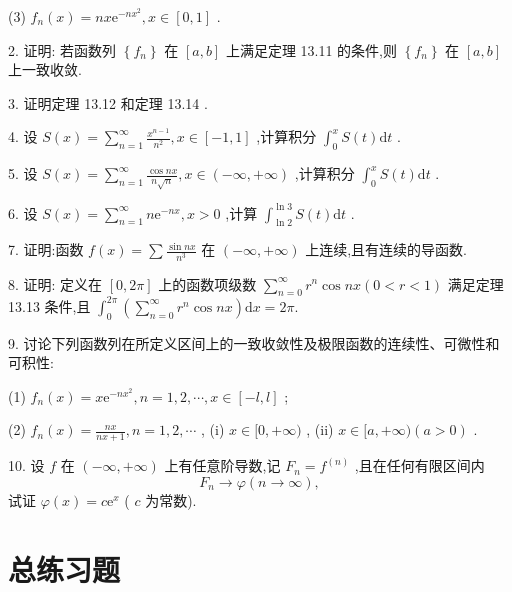 (3) \({f}_{n}\left( x\right)  = {nx}{\mathrm{e}}^{-n{x}^{2}},x \in  \left\lbrack  {0,1}\right\rbrack\) .

2. 证明: 若函数列 \(\left\{  {f}_{n}\right\}\) 在 \(\left\lbrack  {a,b}\right\rbrack\) 上满足定理 13.11 的条件,则 \(\left\{  {f}_{n}\right\}\) 在 \(\left\lbrack  {a,b}\right\rbrack\) 上一致收敛.

3. 证明定理 13.12 和定理 13.14 .

4. 设 \(S\left( x\right)  = \mathop{\sum }\limits_{{n = 1}}^{\infty }\frac{{x}^{n - 1}}{{n}^{2}},x \in  \left\lbrack  {-1,1}\right\rbrack\) ,计算积分 \({\int }_{0}^{x}S\left( t\right) \mathrm{d}t\) .

5. 设 \(S\left( x\right)  = \mathop{\sum }\limits_{{n = 1}}^{\infty }\frac{\cos {nx}}{n\sqrt{n}},x \in  \left( {-\infty , + \infty }\right)\) ,计算积分 \({\int }_{0}^{x}S\left( t\right) \mathrm{d}t\) .

6. 设 \(S\left( x\right)  = \mathop{\sum }\limits_{{n = 1}}^{\infty }n{\mathrm{e}}^{-{nx}},x > 0\) ,计算 \({\int }_{\ln 2}^{\ln 3}S\left( t\right) \mathrm{d}t\) .

7. 证明:函数 \(f\left( x\right)  = \sum \frac{\sin {nx}}{{n}^{3}}\) 在 \(\left( {-\infty , + \infty }\right)\) 上连续,且有连续的导函数.

8. 证明: 定义在 \(\left\lbrack  {0,{2\pi }}\right\rbrack\) 上的函数项级数 \(\mathop{\sum }\limits_{{n = 0}}^{\infty }{r}^{n}\cos {nx}\left( {0 < r < 1}\right)\) 满足定理 13.13 条件,且 \({\int }_{0}^{2\pi }\left( {\mathop{\sum }\limits_{{n = 0}}^{\infty }{r}^{n}\cos {nx}}\right) \mathrm{d}x = {2\pi }.\)

9. 讨论下列函数列在所定义区间上的一致收敛性及极限函数的连续性、可微性和可积性:

(1) \({f}_{n}\left( x\right)  = x{\mathrm{e}}^{-n{x}^{2}},n = 1,2,\cdots ,x \in  \left\lbrack  {-l,l}\right\rbrack\) ;

(2) \({f}_{n}\left( x\right)  = \frac{nx}{{nx} + 1},n = 1,2,\cdots\) , (i) \(x \in  \lbrack 0, + \infty )\) , (ii) \(x \in  \lbrack a, + \infty )\left( {a > 0}\right)\) .

10. 设 \(f\) 在 \(\left( {-\infty , + \infty }\right)\) 上有任意阶导数,记 \({F}_{n} = {f}^{\left( n\right) }\) ,且在任何有限区间内
\[
{F}_{n} \rightarrow  \varphi \left( {n \rightarrow  \infty }\right) ,
\]
试证 \(\varphi \left( x\right)  = c{\mathrm{e}}^{x}\) ( \(c\) 为常数).

\section{总练习题}

